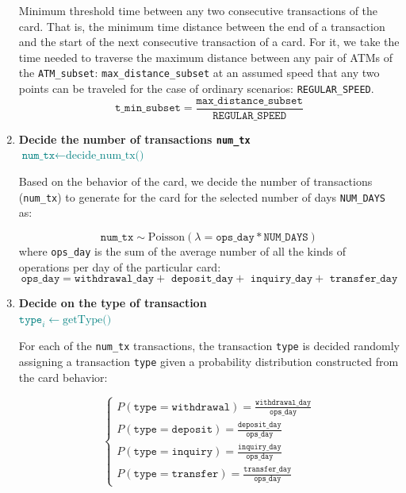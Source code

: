 \begin{enumerate}
    Minimum threshold time between any two consecutive transactions of the card. That is, the minimum time distance between the end of a transaction and the start of the next consecutive transaction of a card. For it, we take the time needed to traverse the maximum distance between any pair of ATMs of the \texttt{ATM\_subset}: \texttt{max\_distance\_subset} at an assumed speed that any two points can be traveled for the case of ordinary scenarios: \texttt{REGULAR\_SPEED}.
    $$\texttt{t\_min\_subset} = \frac{\texttt{max\_distance\_subset}}{\texttt{REGULAR\_SPEED}}$$

    \item \textbf{Decide the number of transactions \texttt{num\_tx}}\\
    {\footnotesize \textcolor{teal}{$\texttt{num\_tx} \gets \text{decide\_num\_tx()}$}}
    
    
    Based on the behavior of the card, we decide the number of transactions (\texttt{num\_tx}) to generate for the card for the selected number of days \texttt{NUM\_DAYS} as:

    $$\texttt{num\_tx} \sim \text{Poisson}(\lambda = \texttt{ops\_day} * \texttt{NUM\_DAYS})$$ where \texttt{ops\_day} is the sum of the average number of all the kinds of operations per day of the particular card: 
    $$\texttt{ops\_day} = \texttt{withdrawal\_day} + \texttt{ deposit\_day} + \texttt{ inquiry\_day} + \texttt{ transfer\_day}$$


    \item \textbf{Decide on the type of transaction}\\
    {\footnotesize \textcolor{teal}{$\texttt{type}_{i} \gets \text{getType()}$}}

    
    For each of the \texttt{num\_tx} transactions, the transaction \texttt{type} is decided randomly assigning a transaction \texttt{type} given a probability distribution constructed from the card behavior:
    
    $$
    \begin{cases}
      P(\texttt{type} =  \texttt{withdrawal}) = \frac{\texttt{withdrawal\_day}}{\texttt{ops\_day}} \\[8pt]
      P(\texttt{type} =  \texttt{deposit}) = \frac{\texttt{deposit\_day}}{\texttt{ops\_day}} \\[8pt]
      P(\texttt{type} = \texttt{inquiry}) = \frac{\texttt{inquiry\_day}}{\texttt{ops\_day}} \\[8pt]
      P(\texttt{type} =  \texttt{transfer}) = \frac{\texttt{transfer\_day}}{\texttt{ops\_day}} 
    \end{cases}
    $$


\end{enumerate}
